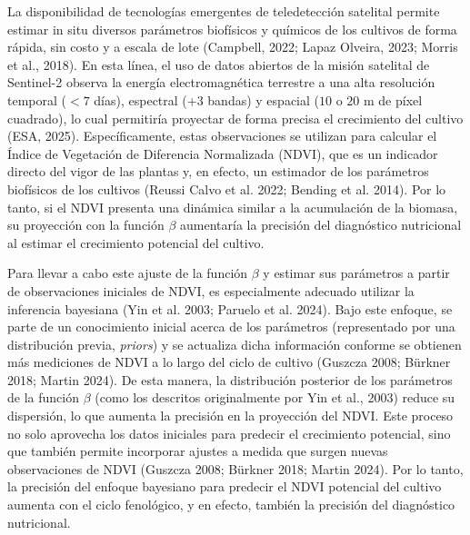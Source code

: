 \documentclass[
11pt, %
]{charter}
\begin{document}
La disponibilidad de tecnologías emergentes de teledetección satelital permite estimar in situ diversos parámetros biofísicos y químicos de los cultivos de forma rápida, sin costo y a escala de lote (Campbell, 2022; Lapaz Olveira, 2023; Morris et al., 2018). En esta línea, el uso de datos abiertos de la misión satelital de Sentinel-2 observa la energía electromagnética terrestre a una alta resolución temporal ($\mathbb{<}7$ días), espectral (+3 bandas) y espacial ($10$ o $20$ m de píxel cuadrado), lo cual permitiría proyectar de forma precisa el crecimiento del cultivo (ESA, 2025). Específicamente, estas observaciones se utilizan para calcular el Índice de Vegetación de Diferencia Normalizada (NDVI), que es un indicador directo del vigor de las plantas y, en efecto, un estimador de los parámetros biofísicos de los cultivos (Reussi Calvo et al. 2022; Bending et al. 2014). Por lo tanto, si el NDVI presenta una dinámica similar a la acumulación de la biomasa, su proyección con la función $\beta$ aumentaría la precisión del diagnóstico nutricional al estimar el crecimiento potencial del cultivo.

Para llevar a cabo este ajuste de la función $\beta$ y estimar sus parámetros a partir de observaciones iniciales de NDVI, es especialmente adecuado utilizar la inferencia bayesiana (Yin et al. 2003; Paruelo et al. 2024). Bajo este enfoque, se parte de un conocimiento inicial acerca de los parámetros (representado por una distribución previa, \emph{priors}) y se actualiza dicha información conforme se obtienen más mediciones de NDVI a lo largo del ciclo de cultivo (Guszcza 2008; Bürkner 2018; Martin 2024). De esta manera, la distribución posterior de los parámetros de la función $\beta$ (como los descritos originalmente por Yin et al., 2003) reduce su dispersión, lo que aumenta la precisión en la proyección del NDVI. Este proceso no solo aprovecha los datos iniciales para predecir el crecimiento potencial, sino que también permite incorporar ajustes a medida que surgen nuevas observaciones de NDVI (Guszcza 2008; Bürkner 2018; Martin 2024). Por lo tanto, la precisión del enfoque bayesiano para predecir el NDVI potencial del cultivo aumenta con el ciclo fenológico, y en efecto, también la precisión del diagnóstico nutricional.
\end{document}
